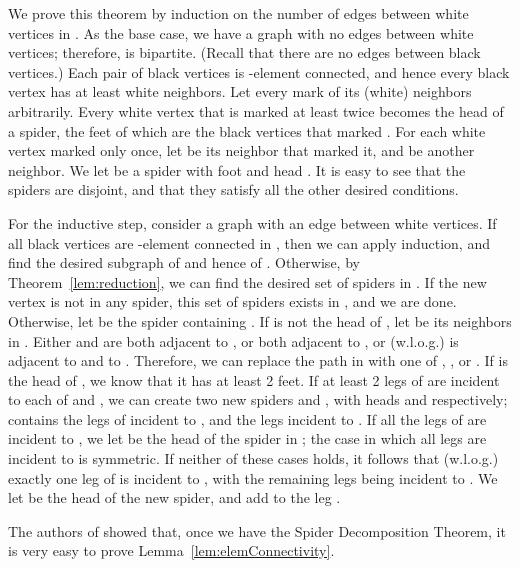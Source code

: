 \documentclass[11pt]{article}
\renewenvironment{proof}{\vspace{-0.1in}\noindent{\bf Proof:}}{\hspace*{\fill}\par}
\begin{document}
\begin{proof}
  We prove this theorem by induction on the number of edges between
  white vertices in . As the base case, we have a graph  with no
  edges between white vertices; therefore,  is bipartite. (Recall
  that there are no edges between black vertices.)  Each pair of black
  vertices is -element connected, and hence every black vertex has
  at least  white neighbors. Let every  mark  of its
  (white) neighbors arbitrarily. Every white vertex  that is marked
  at least twice becomes the head of a spider, the feet of which are
  the black vertices that marked . For each white vertex  marked
  only once, let  be its neighbor that marked it, and  be
  another neighbor. We let  be a spider with foot  and head
  . It is easy to see that the spiders are disjoint, and that they
  satisfy all the other desired conditions.

  For the inductive step, consider a graph  with an edge 
  between white vertices. If all black vertices are -element
  connected in , then we can apply induction, and find
  the desired subgraph of  and hence of . Otherwise, by
  Theorem~\ref{lem:reduction}, we can find the desired set of spiders
  in . If the new vertex  is not in any spider,
  this set of spiders exists in , and we are done. Otherwise, let
   be the spider containing . If  is not the head of , let
   be its neighbors in . Either  and  are both adjacent
  to , or both adjacent to , or (w.l.o.g.)  is adjacent to
   and  to . Therefore, we can replace the path  in
   with one of , , or .  If  is the head
  of , we know that it has at least 2 feet. If at least 2 legs of
   are incident to each of  and , we can create two new
  spiders  and , with heads  and  respectively; 
  contains the legs of  incident to , and  the legs
  incident to . If all the legs of  are incident to , we let
   be the head of the spider in ; the case in which all legs are
  incident to  is symmetric. If neither of these cases holds, it
  follows that (w.l.o.g.)  exactly one leg  of  is incident
  to , with the remaining legs being incident to . We let  be
  the head of the new spider, and add  to the leg .
\end{proof}

The authors of \cite{ChuzhoyK08} showed that, once we have the Spider
Decomposition Theorem, it is very easy to prove
Lemma~\ref{lem:elemConnectivity}.
\end{document}
